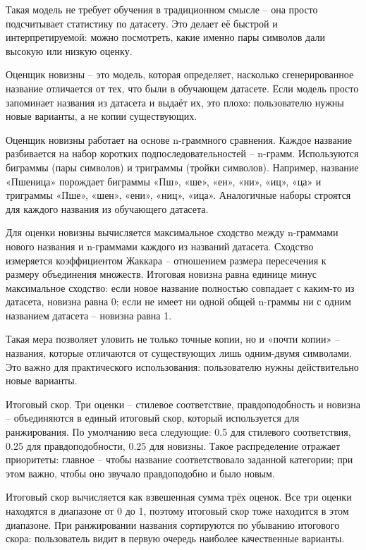Такая модель не требует обучения в традиционном смысле -- она просто подсчитывает статистику по датасету. Это делает её быстрой и интерпретируемой: можно посмотреть, какие именно пары символов дали высокую или низкую оценку.

Оценщик новизны -- это модель, которая определяет, насколько сгенерированное название отличается от тех, что были в обучающем датасете. Если модель просто запоминает названия из датасета и выдаёт их, это плохо: пользователю нужны новые варианты, а не копии существующих.

Оценщик новизны работает на основе n-граммного сравнения. Каждое название разбивается на набор коротких подпоследовательностей -- n-грамм. Используются биграммы (пары символов) и триграммы (тройки символов). Например, название «Пшеница» порождает биграммы «Пш», «ше», «ен», «ни», «иц», «ца» и триграммы «Пше», «шен», «ени», «ниц», «ица». Аналогичные наборы строятся для каждого названия из обучающего датасета.

Для оценки новизны вычисляется максимальное сходство между n-граммами нового названия и n-граммами каждого из названий датасета. Сходство измеряется коэффициентом Жаккара -- отношением размера пересечения к размеру объединения множеств. Итоговая новизна равна единице минус максимальное сходство: если новое название полностью совпадает с каким-то из датасета, новизна равна 0; если не имеет ни одной общей n-граммы ни с одним названием датасета -- новизна равна 1.

Такая мера позволяет уловить не только точные копии, но и «почти копии» -- названия, которые отличаются от существующих лишь одним-двумя символами. Это важно для практического использования: пользователю нужны действительно новые варианты.

Итоговый скор. Три оценки -- стилевое соответствие, правдоподобность и новизна -- объединяются в единый итоговый скор, который используется для ранжирования. По умолчанию веса следующие: 0.5 для стилевого соответствия, 0.25 для правдоподобности, 0.25 для новизны. Такое распределение отражает приоритеты: главное -- чтобы название соответствовало заданной категории; при этом важно, чтобы оно звучало правдоподобно и было новым.

Итоговый скор вычисляется как взвешенная сумма трёх оценок. Все три оценки находятся в диапазоне от 0 до 1, поэтому итоговый скор тоже находится в этом диапазоне. При ранжировании названия сортируются по убыванию итогового скора: пользователь видит в первую очередь наиболее качественные варианты.

